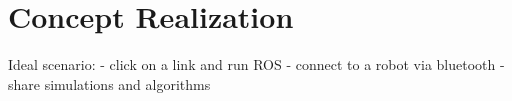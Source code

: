 \chapter{Concept Realization}\label{cha:concept}


Ideal scenario: 
- click on a link and run ROS
- connect to a robot via bluetooth
- share simulations and algorithms